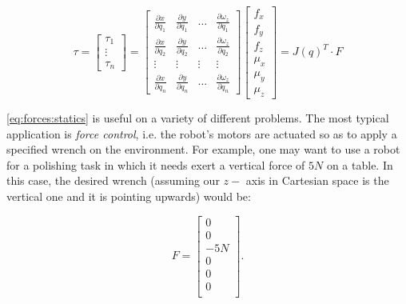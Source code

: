 \begin{equation}\label{eq:forces:statics:long}
\tau = \left[\begin{array}{c}\tau_1\\\vdots\\\tau_n\end{array}\right] =
\left[\begin{array}{cccc}\frac{\partial{x}}{\partial{q_1}} & \frac{\partial{y}}{\partial{q_1}} & \ldots & \frac{\partial{\omega_z}}{\partial{q_1}}\\\frac{\partial{x}}{\partial{q_2}} & \frac{\partial{y}}{\partial{q_2}} & \ldots & \frac{\partial{\omega_z}}{\partial{q_2}}\\\vdots & \vdots & \vdots & \vdots\\\frac{\partial{x}}{\partial{q_n}} & \frac{\partial{y}}{\partial{q_n}} & \ldots & \frac{\partial{\omega_z}}{\partial{q_n}}\end{array}\right]\left[\begin{array}{c}f_x\\f_y\\f_z\\\mu_x\\\mu_y\\\mu_z\end{array}\right] = J(q) ^T \cdot F
\end{equation}

\cref{eq:forces:statics} is useful on a variety of different problems. The most typical application is \textsl{force control}, i.e. the robot's motors are actuated so as to apply a specified wrench on the environment. For example, one may want to use a robot for a polishing task in which it needs exert a vertical force of $5N$ on a table. In this case, the desired wrench (assuming our $z-$ axis in Cartesian space is the vertical one and it is pointing upwards) would be:

\begin{equation}
F=\left[\begin{array}{c} 0\\ 0\\ -5N\\ 0\\ 0\\ 0\\ \end{array} \right].
\end{equation}


